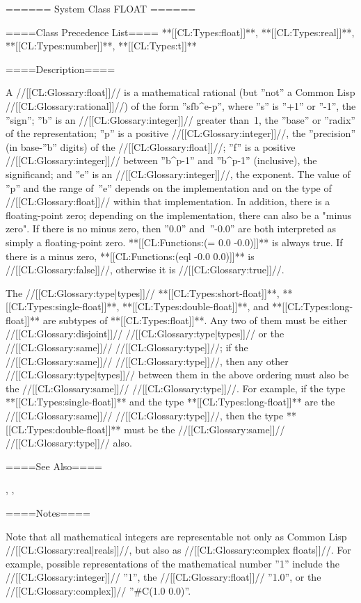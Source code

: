 ====== System Class FLOAT ======

====Class Precedence List==== **[[CL:Types:float]]**, **[[CL:Types:real]]**, **[[CL:Types:number]]**, **[[CL:Types:t]]**

====Description====

A //[[CL:Glossary:float]]// is a mathematical rational (but ''not'' a Common Lisp //[[CL:Glossary:rational]]//) of the form ''s\cdot f\cdot b^{e-p}'', where ''s'' is ''+1'' or ''-1'', the ''sign''; ''b'' is an //[[CL:Glossary:integer]]// greater than~1, the ''base'' or ''radix'' of the representation; ''p'' is a positive //[[CL:Glossary:integer]]//, the ''precision'' (in base-''b'' digits) of the //[[CL:Glossary:float]]//; ''f'' is a positive //[[CL:Glossary:integer]]// between ''b^{p-1}'' and ''b^p-1'' (inclusive), the significand; and ''e'' is an //[[CL:Glossary:integer]]//, the exponent. The value of ''p'' and the range of~''e'' depends on the implementation and on the type of //[[CL:Glossary:float]]// within that implementation. In addition, there is a floating-point zero; depending on the implementation, there can also be a "minus zero". If there is no minus zero, then ''0.0'' and~''-0.0'' are both interpreted as simply a floating-point zero. **[[CL:Functions:(= 0.0 -0.0)]]** is always true. If there is a minus zero, **[[CL:Functions:(eql -0.0 0.0)]]** is //[[CL:Glossary:false]]//, otherwise it is //[[CL:Glossary:true]]//.



The //[[CL:Glossary:type|types]]// **[[CL:Types:short-float]]**, **[[CL:Types:single-float]]**, **[[CL:Types:double-float]]**, and **[[CL:Types:long-float]]** are subtypes of **[[CL:Types:float]]**. Any two of them must be either //[[CL:Glossary:disjoint]]// //[[CL:Glossary:type|types]]// or the //[[CL:Glossary:same]]// //[[CL:Glossary:type]]//; if the //[[CL:Glossary:same]]// //[[CL:Glossary:type]]//, then any other //[[CL:Glossary:type|types]]// between them in the above ordering must also be the //[[CL:Glossary:same]]// //[[CL:Glossary:type]]//. For example, if the type **[[CL:Types:single-float]]** and the type **[[CL:Types:long-float]]** are the //[[CL:Glossary:same]]// //[[CL:Glossary:type]]//, then the type **[[CL:Types:double-float]]** must be the //[[CL:Glossary:same]]// //[[CL:Glossary:type]]// also.


====See Also====

{\figref\SyntaxForNumericTokens}, {\secref\NumsFromTokens}, {\secref\PrintingFloats}

====Notes====

Note that all mathematical integers are representable not only as Common Lisp //[[CL:Glossary:real|reals]]//, but also as //[[CL:Glossary:complex floats]]//. For example, possible representations of the mathematical number ''1'' include the //[[CL:Glossary:integer]]// ''1'', the //[[CL:Glossary:float]]// ''1.0'', or the //[[CL:Glossary:complex]]// ''#C(1.0 0.0)''.

